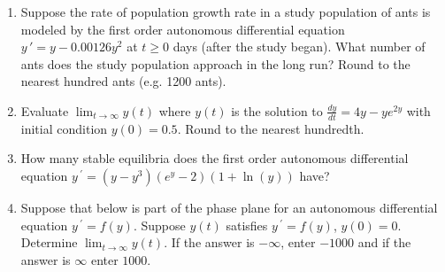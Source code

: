 \documentclass{ximera}
\begin{document}
\begin{enumerate}[label=(\arabic*)]
\begin{enumerate}[label=(\alph*)]
\item $y(0)=-3$

\item $y(0)=-2$  %

\item $y(0)=-1$  %

\item $y(0)=0$

\item $y(0)=1$

\item $y(0)=2$

\item $y(0)=4$

\end{enumerate}


\item Suppose the rate of population growth rate in a study population of ants is modeled by the first order autonomous differential equation $\displaystyle y\,'=y-0.00126y^2$ at $t\geq 0$ days (after the study began).  What number of ants does the study population approach in the long run?  Round to the nearest hundred ants (e.g. 1200 ants).\\



\item Evaluate $\displaystyle \lim_{t\rightarrow\infty}y(t)$ where $y(t)$ is the solution to $\displaystyle \frac{dy}{dt}=4y-ye^{2y}$ with initial condition $y(0)=0.5$. Round to the nearest hundredth.\\



\item How many stable equilibria does the first order autonomous differential equation $y\,^{\prime}=(y-y^3)(e^{y}-2)(1+\ln{(y)})$ have? 





\newpage

\item Suppose that below is part of the phase plane for an autonomous differential equation $y\,^{\prime}=f(y)$.  Suppose $y(t)$ satisfies $y\,^{\prime}=f(y)$, $y(0)=0$.  Determine $\displaystyle \lim_{t\rightarrow \infty} y(t)$. If the answer is $-\infty$, enter $-1000$ and if the answer is $\infty$ enter $1000$.



\end{enumerate}
\end{document}
